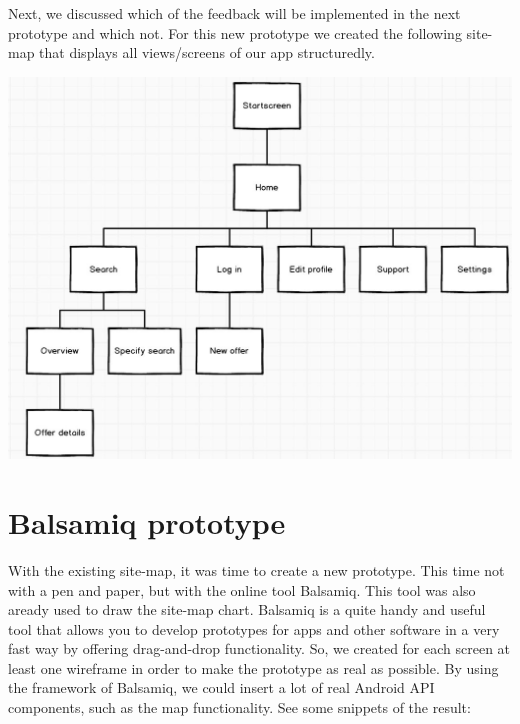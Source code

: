 \documentclass[11pt,twoside,a4paper]{report}
\begin{document}
Next, we discussed which of the feedback will be implemented in the next
prototype and which not. For this new prototype we created the following
site-map that displays all views/screens of our app structuredly.

\includegraphics[scale=0.65]{sitemap.jpg}

\section{Balsamiq prototype}

With the existing site-map, it was time to create a new prototype. This
time not with a pen and paper, but with the online tool Balsamiq. This
tool was also aready used to draw the site-map chart. Balsamiq is a quite
handy and useful tool that allows you to develop prototypes for apps and
other software in a very fast way by oﬀering drag-and-drop functionality.
So, we created for each screen at least one wireframe in order to make the
prototype as real as possible. By using the framework of Balsamiq, we could
insert a lot of real Android API components, such as the map functionality.
See some snippets of the result:
\end{document}
